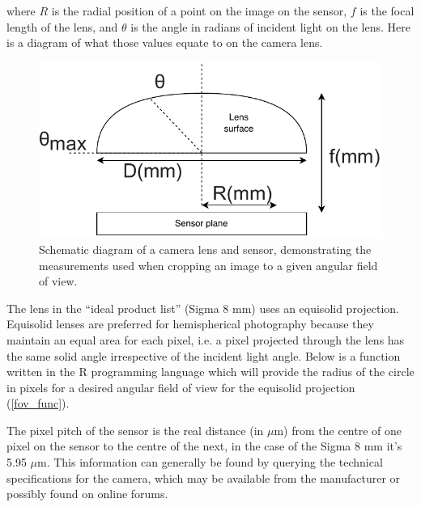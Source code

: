 \documentclass[11pt,a4paper]{article}
\newcommand\file[1]{\texttt{\underline{#1}}}  %
\begin{document}
where $R$ is the radial position of a point on the image on the sensor, $f$ is the focal length of the lens, and $\theta$ is the angle in radians of incident light on the lens. Here is a diagram of what those values equate to on the camera lens.

\begin{figure}[H]
\centering
	\includegraphics[width=\textwidth]{fov_diagram.drawio}
	\caption{Schematic diagram of a camera lens and sensor, demonstrating the measurements used when cropping an image to a given angular field of view.}
	\label{fov_diagram}
\end{figure}

The lens in the ``ideal product list'' (Sigma 8 mm) uses an equisolid projection. Equisolid lenses are preferred for hemispherical photography because they maintain an equal area for each pixel, i.e. a pixel projected through the lens has the same solid angle irrespective of the incident light angle. Below is a function written in the R programming language which will provide the radius of the circle in pixels for a desired angular field of view for the equisolid projection (\autoref{fov_func}).

\begin{minipage}{\linewidth}

\end{minipage}

The pixel pitch of the sensor is the real distance (in $\mu$m) from the centre of one pixel on the sensor to the centre of the next, in the case of the Sigma 8 mm it's 5.95 $\mu$m. This information can generally be found by querying the technical specifications for the camera, which may be available from the manufacturer or possibly found on online forums.
\end{document}
